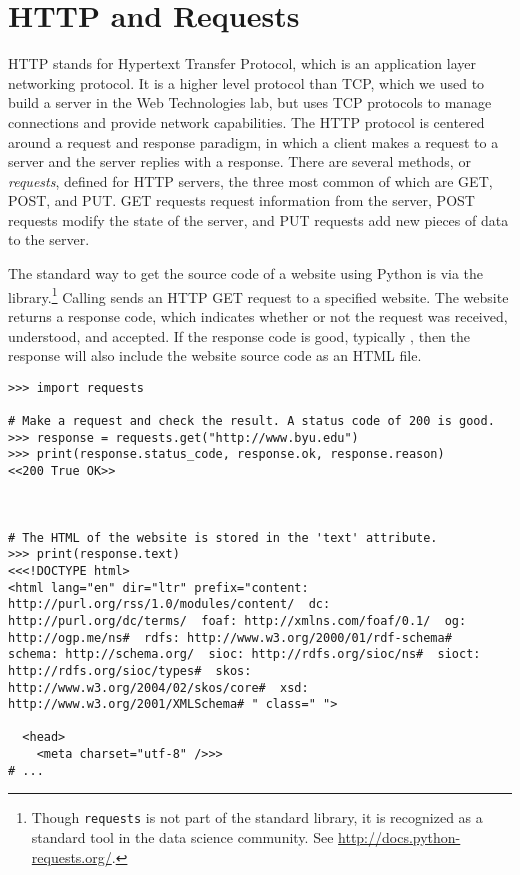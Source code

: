 
\section*{HTTP and Requests} %

HTTP stands for Hypertext Transfer Protocol, which is an application layer networking protocol.
It is a higher level protocol than TCP, which we used to build a server in the Web Technologies lab, but uses TCP protocols to manage connections and provide network capabilities.
The HTTP protocol is centered around a request and response paradigm, in which a client makes a request to a server and the server replies with a response.
There are several methods, or \emph{requests}, defined for HTTP servers, the three most common of which are GET, POST, and PUT.
GET requests request information from the server, POST requests modify the state of the server, and PUT requests add new pieces of data to the server.

The standard way to get the source code of a website using Python is via the  library.\footnote{Though \texttt{requests} is not part of the standard library, it is recognized as a standard tool in the data science community. See \url{http://docs.python-requests.org/}.}
Calling  sends an HTTP GET request to a specified website.
The website returns a response code, which indicates whether or not the request was received, understood, and accepted.
If the response code is good, typically , then the response will also include the website source code as an HTML file.

\begin{lstlisting}
>>> import requests

# Make a request and check the result. A status code of 200 is good.
>>> response = requests.get("http://www.byu.edu")
>>> print(response.status_code, response.ok, response.reason)
<<200 True OK>>



# The HTML of the website is stored in the 'text' attribute.
>>> print(response.text)
<<<!DOCTYPE html>
<html lang="en" dir="ltr" prefix="content: http://purl.org/rss/1.0/modules/content/  dc: http://purl.org/dc/terms/  foaf: http://xmlns.com/foaf/0.1/  og: http://ogp.me/ns#  rdfs: http://www.w3.org/2000/01/rdf-schema#  schema: http://schema.org/  sioc: http://rdfs.org/sioc/ns#  sioct: http://rdfs.org/sioc/types#  skos: http://www.w3.org/2004/02/skos/core#  xsd: http://www.w3.org/2001/XMLSchema# " class=" ">

  <head>
    <meta charset="utf-8" />>>
# ...
\end{lstlisting}

